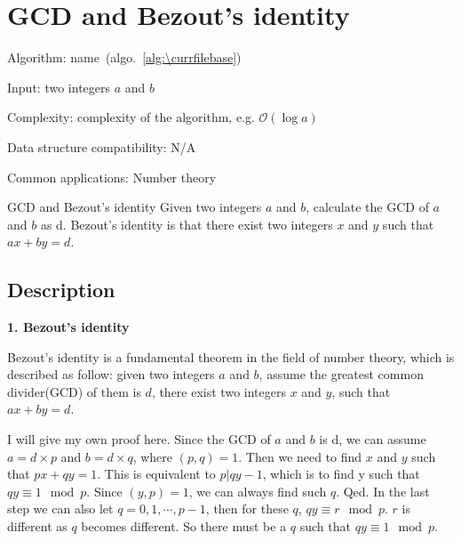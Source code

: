 \documentclass[catalog.tex]{subfiles}
\begin{document}
\def\pbname{GCD and Bezout’s identity} %

\section{\pbname} 

\begin{overview}
\item [Algorithm:] name~(algo.~\ref{alg:\currfilebase}) 
\item [Input:] two integers $a$ and $b$
\item [Complexity:] complexity of the algorithm, e.g. $\mathcal{O}(\log a)$
\item [Data structure compatibility:] N/A 
\item [Common applications:] Number theory
\end{overview}


\begin{problem}{\pbname}
	Given two integers $a$ and $b$, calculate the GCD of $a$ and $b$ as d. Bezout's identity is that there exist two integers $x$ and $y$ such that $ax+by = d$.
\end{problem}

\subsection*{Description}  

\textbf{1. Bezout's identity}\newline

Bezout's identity is a fundamental theorem in the field of number theory, which is described as follow: given two integers $a$ and $b$, assume the greatest common divider(GCD) of them is $d$, there exist two integers $x$ and $y$, such that $ax + by = d$. \newline

I will give my own proof here. Since the GCD of $a$ and $b$ is d, we can assume $a = d\times p$ and $b = d\times q$, where $(p, q) = 1$. Then we need to find $x$ and $y$ such that $px + qy = 1$. This is equivalent to $p|qy - 1$, which is to find y such that $qy\equiv 1\mod p$. Since $(y, p) = 1$, we can always find such $q$. Qed. In the last step we can also let $q = 0, 1, \cdots, p - 1$, then for these $q$, $qy \equiv r \mod p$. $r$ is different as $q$ becomes different. So there must be a $q$ such that $qy \equiv 1 \mod p$.\newline
\end{document}
